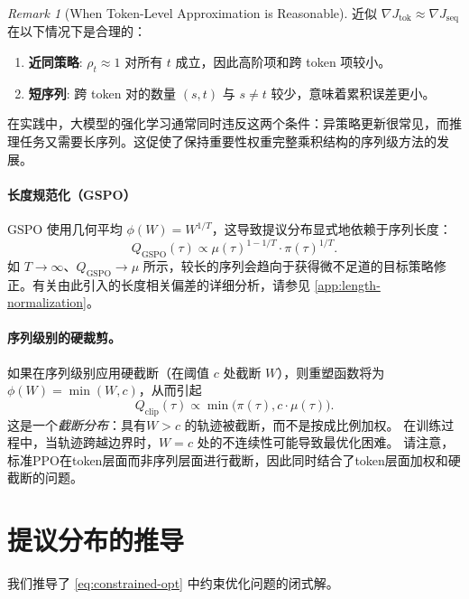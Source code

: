 \documentclass{article}
\theoremstyle{plain}
\theoremstyle{definition}
\theoremstyle{remark}
\newtheorem{remark}[theorem]{Remark}
\begin{document}
\begin{remark}[When Token-Level Approximation is Reasonable]
  近似 $\nabla J_{\text{tok}} \approx \nabla J_{\text{seq}}$ 在以下情况下是合理的：
  \begin{enumerate}[itemsep=0pt, topsep=2pt]
    \item \textbf{近同策略}: $\rho_t \approx 1$ 对所有 $t$ 成立，因此高阶项和跨 token 项较小。
    \item \textbf{短序列}: 跨 token 对的数量 $(s, t)$ 与 $s \neq t$  较少，意味着累积误差更小。
  \end{enumerate}
  在实践中，大模型的强化学习通常同时违反这两个条件：异策略更新很常见，而推理任务又需要长序列。这促使了保持重要性权重完整乘积结构的序列级方法的发展。
\end{remark}

\paragraph{长度规范化（GSPO）}
GSPO 使用几何平均 $\phi(W) = W^{1/T}$，这导致提议分布显式地依赖于序列长度：
\begin{equation}
  Q_{\text{GSPO}}(\tau) \propto \mu(\tau)^{1-1/T} \cdot \pi(\tau)^{1/T}.
\end{equation}
如 $T \to \infty$、$Q_{\text{GSPO}} \to \mu$ 所示，较长的序列会趋向于获得微不足道的目标策略修正。有关由此引入的长度相关偏差的详细分析，请参见 \cref{app:length-normalization}。

\paragraph{序列级别的硬裁剪。}
如果在序列级别应用硬截断（在阈值 $c$ 处截断 $W$），则重塑函数将为 $\phi(W) = \min(W, c)$，从而引起
\begin{equation}
  Q_{\text{clip}}(\tau) \propto \min\bigl(\pi(\tau), c \cdot \mu(\tau)\bigr).
\end{equation}
这是一个\emph{截断分布}：具有$W > c$ 的轨迹被截断，而不是按成比例加权。  
在训练过程中，当轨迹跨越边界时，$W = c$ 处的不连续性可能导致最优化困难。  
请注意，标准PPO在token层面而非序列层面进行截断，因此同时结合了token层面加权和硬截断的问题。


\section{提议分布的推导}
\label{app:variational-derivation}

我们推导了 \cref{eq:constrained-opt} 中约束优化问题的闭式解。
\end{document}
